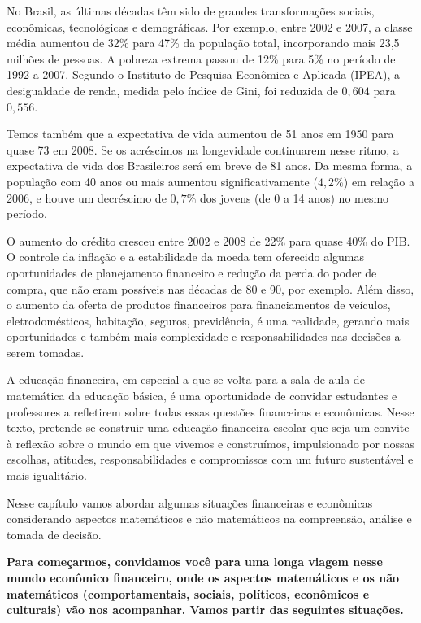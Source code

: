 \label{fin-exp-1}
No Brasil, as últimas décadas têm sido de grandes transformações sociais, econômicas, tecnológicas e demográficas. Por exemplo, entre 2002 e 2007, a classe média aumentou de 32\% para 47\% da população total, incorporando mais 23,5 milhões de pessoas. A pobreza extrema passou de 12\% para 5\% no período de 1992 a 2007. Segundo o Instituto de Pesquisa Econômica e Aplicada (IPEA), a desigualdade de renda, medida pelo índice de Gini, foi reduzida de $0{,}604$ para $0{,}556$.

Temos também que a expectativa de vida aumentou de 51 anos em 1950 para quase 73 em 2008. Se os acréscimos na longevidade continuarem nesse ritmo, a expectativa de vida dos Brasileiros será em breve de 81 anos. Da mesma forma, a população com 40 anos ou mais aumentou significativamente ($4,2\%$) em relação a 2006, e houve um decréscimo de $0,7\%$ dos jovens (de 0 a 14 anos) no mesmo período. 

O aumento do crédito cresceu entre 2002 e 2008 de 22\% para quase 40\% do PIB. O controle da inflação e a estabilidade da moeda tem oferecido algumas oportunidades de planejamento financeiro e redução da perda do poder de compra, que não eram possíveis nas décadas de 80 e 90, por exemplo. Além disso, o aumento da oferta de produtos financeiros para financiamentos de veículos, eletrodomésticos, habitação, seguros, previdência, é uma realidade, gerando mais oportunidades e também mais complexidade e responsabilidades nas decisões a serem tomadas.

A educação financeira, em especial a que se volta para a sala de aula de matemática da educação básica, é uma oportunidade de convidar estudantes e professores a refletirem sobre todas essas questões financeiras e econômicas. Nesse texto, pretende-se construir uma educação financeira escolar que seja um convite à reflexão sobre o mundo em que vivemos e construímos, impulsionado por nossas escolhas, atitudes, responsabilidades e compromissos com um futuro sustentável e mais igualitário.

Nesse capítulo vamos abordar algumas situações financeiras e econômicas considerando aspectos matemáticos e não matemáticos na compreensão, análise e tomada de decisão.

\textbf{Para começarmos, convidamos você para uma longa viagem nesse mundo econômico financeiro, onde os aspectos matemáticos e os não matemáticos (comportamentais, sociais, políticos, econômicos e culturais) vão nos acompanhar. Vamos partir das seguintes situações.}

